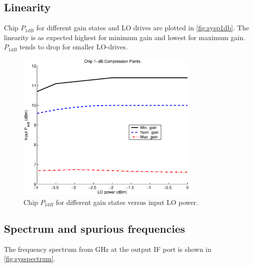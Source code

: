		\subsection{Linearity}
			Chip $P_{1dB}$ for different gain states and LO drives are plotted in \autoref{fig:sysp1db}. The linearity is as expected highest for minimum gain and lowest for maximum gain. $P_{1dB}$ tends to drop for smaller LO-drives. 
			
			
			\begin{figure}[hbt!]
				\centering
				\includegraphics[width=0.8\textwidth]{fig/summary/chipp1db}
				\caption[Chip $P_{1dB}$.]{Chip $P_{1dB}$ for different gain states versus input LO power.}\label{fig:sysp1db}
			\end{figure}
			
		\subsection{Spectrum and spurious frequencies}
			The frequency spectrum from \unit[0 to 10]{GHz} at the output IF port is shown in \autoref{fig:sysspectrum}.
			
